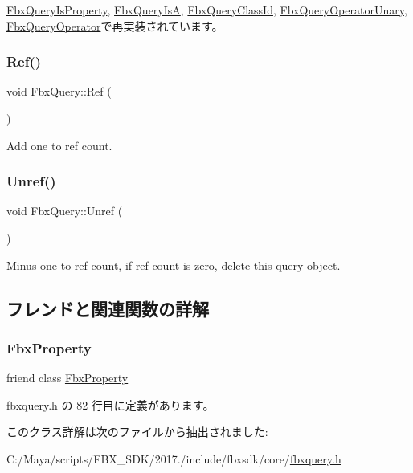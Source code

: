 \hyperlink{class_fbx_query_is_property_a6f9680d513428cba6321203c9b3da71e}{Fbx\+Query\+Is\+Property}, \hyperlink{class_fbx_query_is_a_a6d3da2f05ab6e50346af8e9713168772}{Fbx\+Query\+IsA}, \hyperlink{class_fbx_query_class_id_aaa9990771cab43ddc199eaeac2b6d754}{Fbx\+Query\+Class\+Id}, \hyperlink{class_fbx_query_operator_unary_a4987590ec1680775240b813ec3b2ffb4}{Fbx\+Query\+Operator\+Unary}, \hyperlink{class_fbx_query_operator_a14dd8a653d1e802f43b60c13d137ccce}{Fbx\+Query\+Operator}で再実装されています。

\mbox{\label{class_fbx_query_a0d945a2be30bcfe72a083f0af90d8252}} 
\subsubsection{\texorpdfstring{Ref()}{Ref()}}
{\footnotesize\ttfamily void Fbx\+Query\+::\+Ref (\begin{DoxyParamCaption}{ }\end{DoxyParamCaption})}



Add one to ref count. 

\mbox{\label{class_fbx_query_a572e8b1922846020818adfbdc2a48f74}} 
\subsubsection{\texorpdfstring{Unref()}{Unref()}}
{\footnotesize\ttfamily void Fbx\+Query\+::\+Unref (\begin{DoxyParamCaption}{ }\end{DoxyParamCaption})}



Minus one to ref count, if ref count is zero, delete this query object. 



\subsection{フレンドと関連関数の詳解}
\mbox{\label{class_fbx_query_a5d7018830479ec28905f28575480f88f}} 
\subsubsection{\texorpdfstring{Fbx\+Property}{FbxProperty}}
{\footnotesize\ttfamily friend class \hyperlink{class_fbx_property}{Fbx\+Property}\hspace{0.3cm}{\ttfamily [friend]}}



 fbxquery.\+h の 82 行目に定義があります。



このクラス詳解は次のファイルから抽出されました\+:\begin{DoxyCompactItemize}
\item 
C\+:/\+Maya/scripts/\+F\+B\+X\+\_\+\+S\+D\+K/2017./include/fbxsdk/core/\hyperlink{fbxquery_8h}{fbxquery.\+h}\end{DoxyCompactItemize}
